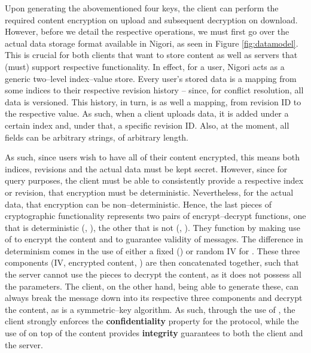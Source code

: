 
Upon generating the abovementioned four keys, the client can perform the required content encryption on upload and subsequent decryption on download.
However, before we detail the respective operations, we must first go over the actual data storage format available in Nigori, as seen in Figure \ref{fig:datamodel}.
This is crucial for both clients that want to store content as well as servers that (must) support respective functionality.
In effect, for a user, Nigori acts as a generic two--level index--value store.
Every user's stored data is a mapping from some indices to their respective revision history -- since, for conflict resolution, all data is versioned.
This history, in turn, is as well a mapping, from revision ID to the respective value.
As such, when a client uploads data, it is added under a certain index and, under that, a specific revision ID.
Also, at the moment, all fields can be arbitrary strings, of arbitrary length.

As such, since users wish to have all of their content encrypted, this means both indices, revisions and the actual data must be kept secret.
However, since for query purposes, the client must be able to consistently provide a respective index or revision, that encryption must be deterministic.
Nevertheless, for the actual data, that encryption can be non--deterministic.
Hence, the last pieces of cryptographic functionality represents two pairs of encrypt--decrypt functions, one that is deterministic (, ), the other that is not (, ).
They function by making use of  to encrypt the content and  to guarantee validity of messages.
The difference in determinism comes in the use of either a fixed () or random IV for .
These three components (IV, encrypted content, ) are then concatenated together, such that the server cannot use the pieces to decrypt the content, as it does not possess all the  parameters.
The client, on the other hand, being able to generate these, can always break the message down into its respective three components and decrypt the content, as  is a symmetric--key algorithm.
As such, through the use of , the client strongly enforces the \textbf{confidentiality} property for the protocol, while the use of  on top of the content provides \textbf{integrity} guarantees to both the client and the server.

